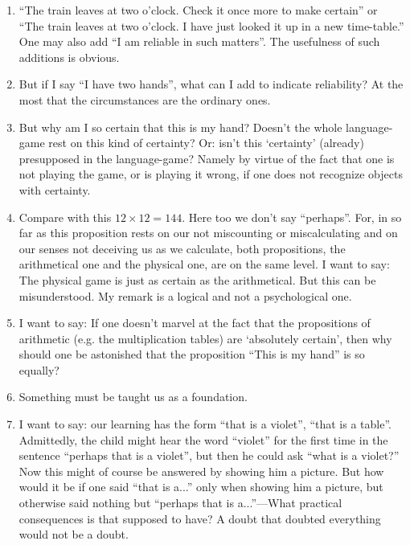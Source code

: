 \documentclass{book}
\begin{document}
\begin{enumerate}
\item
``The train leaves at two o'clock. Check it once more to make certain'' or
``The train leaves at two o'clock. I have just looked it up in a new
time-table.'' One may also add ``I am reliable in such matters''. The
usefulness of such additions is obvious.

\item
But if I say ``I have two hands'', what can I add to indicate reliability? At
the most that the circumstances are the ordinary ones.

\item
But why am I so certain that this is my hand? Doesn't the whole language-game
rest on this kind of certainty?  Or: isn't this `certainty' (already)
presupposed in the language-game? Namely by virtue of the fact that one is not
playing the game, or is playing it wrong, if one does not recognize objects
with certainty.

\item
Compare with this $12{\times}12=144$. Here too we don't say ``perhaps''.  For,
in so far as this proposition rests on our not miscounting or miscalculating
and on our senses not deceiving us as we calculate, both propositions, the
arithmetical one and the physical one, are on the same level.  I want to say:
The physical game is just as certain as the arithmetical. But this can be
misunderstood. My remark is a logical and not a psychological one.

\item
I want to say: If one doesn't marvel at the fact that the propositions of
arithmetic (e.g. the multiplication tables) are `absolutely certain', then why
should one be astonished that the proposition ``This is my hand'' is so
equally?

\item
Something must be taught us as a foundation.

\item
I want to say: our learning has the form ``that is a violet'', ``that is a
table''. Admittedly, the child might hear the word ``violet'' for the first
time in the sentence ``perhaps that is a violet'', but then he could ask ``what
is a violet?'' Now this might of course be answered by showing him a picture.
But how would it be if one said ``that is a...'' only when showing him a
picture, but otherwise said nothing but ``perhaps that is a...''---What
practical consequences is that supposed to have?  A doubt that doubted
everything would not be a doubt.


\end{enumerate}
\end{document}
